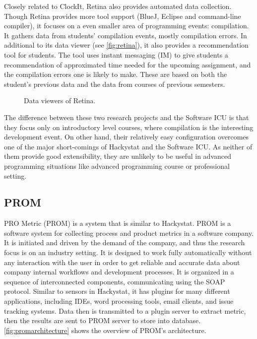 Closely related to ClockIt, Retina also provides automated data collection. Though Retina provides more tool support (BlueJ, Eclipse and command-line compiler), it focuses on a even smaller area of programming events: compilation. It gathers data from students' compilation events, mostly compilation errors. In additional to its data viewer (see \autoref{fig:retina}), it also provides a recommendation tool for students. The tool uses instant messaging (IM) to give students a recommendation of approximated time needed for the upcoming assignment, and the compilation errors one is likely to make. These are based on both the student's previous data and the data from courses of previous semesters. 

\begin{figure}[htbp]
     \centering
          
     \caption{Data viewers of Retina.}
     \label{fig:retina}
\end{figure}

The difference between these two research projects and the Software ICU is that they focus only on introductory level courses, where compilation is the interesting development event. On other hand, their relatively easy configuration overcomes one of the major short-comings of Hackystat and the Software ICU. As neither of them provide good extensibility, they are unlikely to be useful in advanced programming situations like advanced programming course or professional setting.

\subsection {PROM}
PRO Metric (PROM) \cite{prom03} is a system that is similar to Hackystat. PROM is a software system for collecting process and product metrics in a software company. It is initiated and driven by the demand of the company, and thus the research focus is on an industry setting. It is designed to work fully automatically without any interaction with the user in order to get reliable and accurate data about company internal workflows and development processes. It is organized in a sequence of interconnected components, communicating using the SOAP protocol. Similar to sensors in Hackystat, it has plugins for many different applications, including IDEs, word processing tools, email clients, and issue tracking systems. Data then is transmitted to a plugin server to extract metric, then the results are sent to PROM server to store into database. \autoref{fig:promarchitecture} shows the overview of PROM's architecture.

